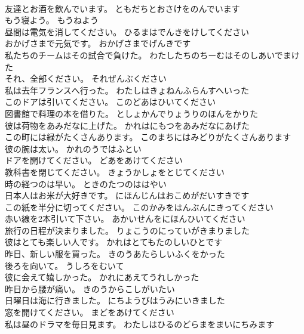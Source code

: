 \documentclass[8pt]{extreport}
\begin{document}
\begin{CJK}{UTF8}{min}
\\	友達とお酒を飲んでいます。	ともだちとおさけをのんでいます 
\\	もう寝よう。	もうねよう 
\\	昼間は電気を消してください。	ひるまはでんきをけしてください 
\\	おかげさまで元気です。	おかげさまでげんきです 
\\	私たちのチームはその試合で負けた。	わたしたちのちーむはそのしあいでまけた 
\\	それ、全部ください。	それぜんぶください 
\\	私は去年フランスへ行った。	わたしはきょねんふらんすへいった 
\\	このドアは引いてください。	このどあはひいてください 
\\	図書館で料理の本を借りた。	としょかんでりょうりのほんをかりた 
\\	彼は荷物をあみだなに上げた。	かれはにもつをあみだなにあげた 
\\	この町には緑がたくさんあります。	このまちにはみどりがたくさんあります 
\\	彼の腕は太い。	かれのうではふとい 
\\	ドアを開けてください。	どあをあけてください 
\\	教科書を閉じてください。	きょうかしょをとじてください 
\\	時の経つのは早い。	ときのたつのははやい 
\\	日本人はお米が大好きです。	にほんじんはおこめがだいすきです 
\\	この紙を半分に切ってください。	このかみをはんぶんにきってください 
\\	赤い線を2本引いて下さい。	あかいせんをにほんひいてください 
\\	旅行の日程が決まりました。	りょこうのにっていがきまりました 
\\	彼はとても楽しい人です。	かれはとてもたのしいひとです 
\\	昨日、新しい服を買った。	きのうあたらしいふくをかった 
\\	後ろを向いて。	うしろをむいて 
\\	彼に会えて嬉しかった。	かれにあえてうれしかった 
\\	昨日から腰が痛い。	きのうからこしがいたい 
\\	日曜日は海に行きました。	にちようびはうみにいきました 
\\	窓を開けてください。	まどをあけてください 
\\	私は昼のドラマを毎日見ます。	わたしはひるのどらまをまいにちみます 

\end{CJK}
\end{document}
